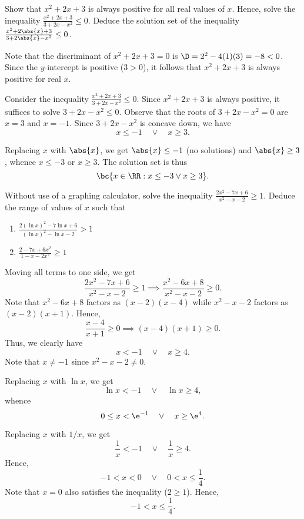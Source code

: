 \begin{problem}
    Show that $x^2 + 2x + 3$ is always positive for all real values of $x$. Hence, solve the inequality $\frac{x^2 + 2x + 3}{3 + 2x - x^2} \leq 0$. Deduce the solution set of the inequality $\frac{x^2 + 2\abs{x} + 3}{3 + 2\abs{x} - x^2} \leq 0$.
\end{problem}
\begin{solution}
    Note that the discriminant of $x^2 + 2x + 3 = 0$ is $\D = 2^2 - 4(1)(3) = -8 < 0$. Since the $y$-intercept is positive ($3 > 0$), it follows that $x^2 + 2x + 3$ is always positive for real $x$.

    Consider the inequality $\frac{x^2 + 2x + 3}{3 + 2x - x^2} \leq 0$. Since $x^2 + 2x + 3$ is always positive, it suffices to solve $3 + 2x - x^2 \leq 0$. Observe that the roots of $3 + 2x - x^2 = 0$ are $x = 3$ and $x = -1$. Since $3 + 2x - x^2$ is concave down, we have \[x \leq -1 \quad \lor \quad x \geq 3.\]

    Replacing $x$ with $\abs{x}$, we get $\abs{x} \leq -1$ (no solutions) and $\abs{x} \geq 3$, whence $x \leq -3$ or $x \geq 3$. The solution set is thus \[\bc{x \in \RR : x \leq -3 \lor x \geq 3}.\]
\end{solution}

\clearpage
\begin{problem}
    Without use of a graphing calculator, solve the inequality $\frac{2x^2 - 7x + 6}{x^2 - x - 2} \geq 1$. Deduce the range of values of $x$ such that
    \begin{enumerate}
        \item $\frac{2(\ln x)^2 - 7\ln x + 6}{(\ln x)^2 - \ln x - 2} > 1$
        \item $\frac{2 - 7x + 6x^2}{1 - x - 2x^2} \geq 1$
    \end{enumerate}
\end{problem}
\begin{solution}
    Moving all terms to one side, we get \[\frac{2x^2 - 7x + 6}{x^2 - x - 2} \geq 1 \implies \frac{x^2 - 6x + 8}{x^2 - x - 2} \geq 0.\] Note that $x^2 - 6x + 8$ factors as $(x-2)(x-4)$ while $x^2 - x - 2$ factors as $(x-2)(x+1)$. Hence, \[\frac{x-4}{x+1} \geq 0 \implies (x-4)(x+1) \geq 0.\] Thus, we clearly have \[x < -1 \quad \lor \quad x \geq 4.\] Note that $x \neq -1$ since $x^2 - x - 2 \neq 0$.

    \begin{ppart}
        Replacing $x$ with $\ln x$, we get \[\ln x < -1 \quad \lor \quad \ln x \geq 4,\] whence \[0 \leq x < \e^{-1} \quad \lor \quad x \geq \e^4.\]
    \end{ppart}
    \begin{ppart}
        Replacing $x$ with $1/x$, we get \[\frac1x < -1 \quad \lor \quad \frac1x \geq 4.\] Hence, \[-1 < x < 0 \quad \lor \quad 0 < x \leq \frac14.\] Note that $x = 0$ also satisfies the inequality ($2 \geq 1$). Hence, \[-1 < x \leq \frac14.\]
    \end{ppart}
\end{solution}

